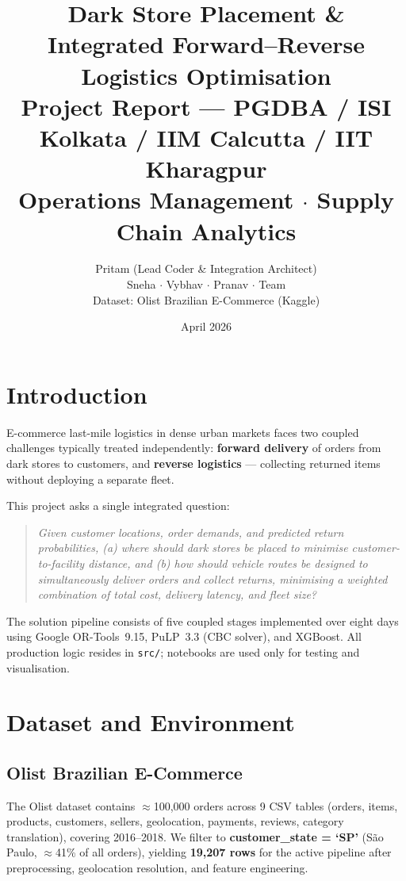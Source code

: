 \documentclass[11pt,a4paper]{article}
\title{
  \textbf{Dark Store Placement \&\\
  Integrated Forward--Reverse Logistics Optimisation}\\[0.4em]
  \large Project Report --- PGDBA / ISI Kolkata / IIM Calcutta / IIT Kharagpur\\[0.2em]
  \normalsize Operations Management $\cdot$ Supply Chain Analytics
}
\author{
  Pritam (Lead Coder \& Integration Architect) \\
  Sneha $\cdot$ Vybhav $\cdot$ Pranav $\cdot$ Team\\[0.2em]
  \small Dataset: Olist Brazilian E-Commerce (Kaggle)
}
\date{April 2026}
\begin{document}
\maketitle
\tableofcontents
\newpage

\section{Introduction}

E-commerce last-mile logistics in dense urban markets faces two coupled
challenges typically treated independently: \textbf{forward delivery} of
orders from dark stores to customers, and \textbf{reverse logistics} ---
collecting returned items without deploying a separate fleet.

This project asks a single integrated question:
\begin{quote}
  \textit{Given customer locations, order demands, and predicted return
  probabilities, (a) where should dark stores be placed to minimise
  customer-to-facility distance, and (b) how should vehicle routes be designed
  to simultaneously deliver orders and collect returns, minimising a weighted
  combination of total cost, delivery latency, and fleet size?}
\end{quote}

The solution pipeline consists of five coupled stages implemented over eight
days using Google OR-Tools~9.15, PuLP~3.3 (CBC solver), and XGBoost.
All production logic resides in \texttt{src/}; notebooks are used only for
testing and visualisation.

\section{Dataset and Environment}

\subsection{Olist Brazilian E-Commerce}
The Olist dataset contains $\approx$100,000 orders across 9 CSV tables
(orders, items, products, customers, sellers, geolocation, payments,
reviews, category translation), covering 2016--2018.
We filter to \textbf{customer\_state = `SP'} (S\~ao Paulo, $\approx$41\% of
all orders), yielding \textbf{19,207 rows} for the active pipeline
after preprocessing, geolocation resolution, and feature engineering.
\end{document}
